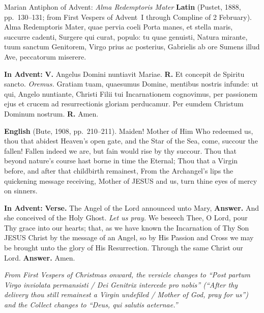 \begin{massbox}{Marian Antiphon of Advent: \textit{Alma Redemptoris Mater}}
\textbf{Latin} (Pustet, 1888, pp.~130--131; from First Vespers of Advent~I
through Compline of 2 February). Alma Redemptoris Mater, quae pervia coeli Porta
manes, et stella maris, succurre cadenti, Surgere qui curat, populo: tu quae
genuisti, Natura mirante, tuum sanctum Genitorem, Virgo prius ac posterius,
Gabrielis ab ore Sumens illud Ave, peccatorum miserere.

\textbf{In Advent:} \textbf{V.} Angelus Domini nuntiavit Mariae. \textbf{R.} Et
concepit de Spiritu sancto. \textit{Oremus.} Gratiam tuam, quaesumus Domine,
mentibus nostris infunde: ut qui, Angelo nuntiante, Christi Filii tui
Incarnationem cognovimus, per passionem ejus et crucem ad resurrectionis gloriam
perducamur. Per eumdem Christum Dominum nostrum. \textbf{R.} Amen.

\textbf{English} (Bute, 1908, pp.~210--211). Maiden! Mother of Him Who redeemed
us, thou that abidest Heaven's open gate, and the Star of the Sea, come, succour
the fallen! Fallen indeed we are, but fain would rise by thy succour. Thou that
beyond nature's course hast borne in time the Eternal; Thou that a Virgin
before, and after that childbirth remainest, From the Archangel's lips the
quickening message receiving, Mother of JESUS and us, turn thine eyes of mercy on
sinners.

\textbf{In Advent:} \textbf{Verse.} The Angel of the Lord announced unto Mary,
\textbf{Answer.} And she conceived of the Holy Ghost. \textit{Let us pray.} We
beseech Thee, O Lord, pour Thy grace into our hearts; that, as we have known the
Incarnation of Thy Son JESUS Christ by the message of an Angel, so by His
Passion and Cross we may be brought unto the glory of His Resurrection. Through
the same Christ our Lord. \textbf{Answer.} Amen.

\textit{From First Vespers of Christmas onward, the versicle changes to
``Post partum Virgo inviolata permansisti / Dei Genitrix intercede pro nobis''
(``After thy delivery thou still remainest a Virgin undefiled / Mother of God,
pray for us'') and the Collect changes to ``Deus, qui salutis aeternae.''}
\end{massbox}

